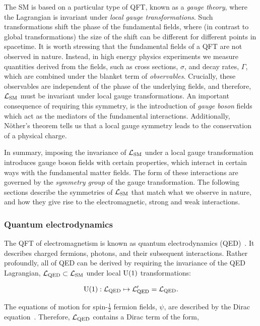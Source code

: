 The SM is based on a particular type of QFT, known as a \textit{gauge theory}, where the Lagrangian is invariant under \textit{local gauge transformations}. Such transformations shift the phase of the fundamental fields, where (in contrast to global transformations) the size of the shift can be different for different points in spacetime. 
It is worth stressing that the fundamental fields of a QFT are not observed in nature. Instead, in high energy physics experiments we measure quantities derived from the fields, such as cross sections, $\sigma$, and decay rates, $\Gamma$, which are combined under the blanket term of \textit{observables}. Crucially, these observables are independent of the phase of the underlying fields, and therefore, $\mathcal{L}_{\rm{SM}}$ must be invariant under local gauge transformations. An important consequence of requiring this symmetry, is the introduction of \textit{gauge boson} fields which act as the mediators of the fundamental interactions. Additionally, N\"{o}ther's theorem tells us that a local gauge symmetry leads to the conservation of a physical charge.

In summary, imposing the invariance of $\mathcal{L}_{\rm{SM}}$ under a local gauge transformation introduces gauge boson fields with certain properties, which interact in certain ways with the fundamental matter fields. The form of these interactions are governed by the \textit{symmetry group} of the gauge transformation. The following sections describe the symmetries of $\mathcal{L}_{\rm{SM}}$ that match what we observe in nature, and how they give rise to the electromagnetic, strong and weak interactions.

\subsubsection{Quantum electrodynamics}
The QFT of electromagnetism is known as quantum electrodynamics (QED)~\cite{Aitchison:2003tq}. It describes charged fermions, photons, and their subsequent interactions. Rather profoundly, all of QED can be derived by requiring the invariance of the QED Lagrangian, $\mathcal{L}_{\rm{QED}} \subset \mathcal{L}_{\rm{SM}}$ under local ${\rm{U}}(1)$ transformations:

\begin{equation}\label{eq:u1_gaugeinvariance}
    {\rm{U}}(1): \mathcal{L}_{\rm{QED}} \mapsto \mathcal{L}'_{\rm{QED}} = \mathcal{L}_{\rm{QED}}.
\end{equation}

The equations of motion for spin-$\frac{1}{2}$ fermion fields, $\psi$, are described by the Dirac equation~\cite{doi:10.1098_rspa.1928.0023}. Therefore, $\mathcal{L}_{\rm{QED}}$ contains a Dirac term of the form,

